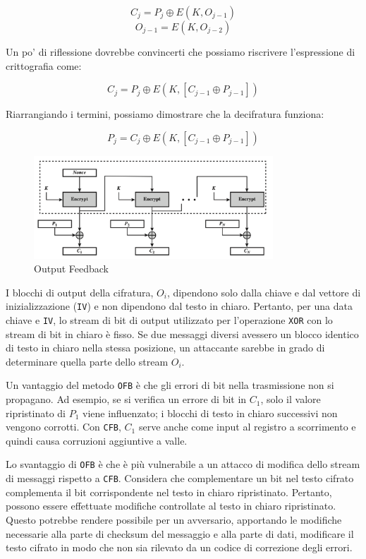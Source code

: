 \[ C_j = P_j \oplus E(K, O_{j-1}) \]
\[ O_{j-1} = E(K, O_{j-2}) \]

Un po' di riflessione dovrebbe convincerti che possiamo riscrivere
l'espressione di crittografia come:

\[ C_j = P_j \oplus E(K, [C_{j-1} \oplus P_{j-1}]) \]

Riarrangiando i termini, possiamo dimostrare che la decifratura funziona:

\[ P_j = C_j \oplus E(K, [C_{j-1} \oplus P_{j-1}]) \]

\begin{figure}[H]
    \centering
    \includegraphics[width=0.8\textwidth]{img/outputFeedback.png}
    \caption{Output Feedback}
    \label{fig:outputFeedback}
\end{figure}
I blocchi di output della cifratura, \(O_i\), dipendono solo dalla chiave
e dal vettore di inizializzazione (\verb|IV|) e non dipendono dal testo
in chiaro. Pertanto, per una data chiave e \verb|IV|, lo stream di bit di
output utilizzato per l'operazione \texttt{XOR} con lo stream di bit in chiaro è fisso.
Se due messaggi diversi avessero un blocco identico di testo in chiaro
nella stessa posizione, un attaccante sarebbe in grado di determinare
quella parte dello stream \(O_i\).

Un vantaggio del metodo \verb|OFB| è che gli errori di bit nella trasmissione non
si propagano. Ad esempio, se si verifica un errore di bit in \(C_1\), solo
il valore ripristinato di \(P_1\) viene influenzato; i blocchi di testo in
chiaro successivi non vengono corrotti. Con \verb|CFB|, \(C_1\) serve anche come
input al registro a scorrimento e quindi causa corruzioni aggiuntive a valle.

Lo svantaggio di \verb|OFB| è che è più vulnerabile a un attacco di modifica dello
stream di messaggi rispetto a \verb|CFB|. Considera che complementare un bit nel
testo cifrato complementa il bit corrispondente nel testo in chiaro
ripristinato. Pertanto, possono essere effettuate modifiche controllate
al testo in chiaro ripristinato. Questo potrebbe rendere possibile per un
avversario, apportando le modifiche necessarie alla parte di checksum del
messaggio e alla parte di dati, modificare il testo cifrato in modo che non
sia rilevato da un codice di correzione degli errori.

